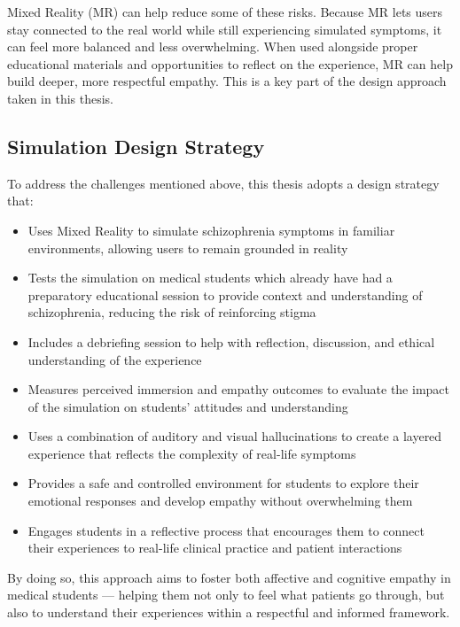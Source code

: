 Mixed Reality (MR) can help reduce some of these risks. Because MR lets users stay connected to the real world while still experiencing simulated symptoms, it can feel more balanced and less overwhelming. When used alongside proper educational materials and opportunities to reflect on the experience, MR can help build deeper, more respectful empathy. This is a key part of the design approach taken in this thesis.


\subsection{Simulation Design Strategy}
To address the challenges mentioned above, this thesis adopts a design strategy that:

\begin{itemize}
    \item Uses Mixed Reality to simulate schizophrenia symptoms in familiar environments, allowing users to remain grounded in reality
    \item Tests the simulation on medical students which already have had a preparatory educational session to provide context and understanding of schizophrenia, reducing the risk of reinforcing stigma
    \item Includes a debriefing session to help with reflection, discussion, and ethical understanding of the experience
    \item Measures perceived immersion and empathy outcomes to evaluate the impact of the simulation on students' attitudes and understanding
    \item Uses a combination of auditory and visual hallucinations to create a layered experience that reflects the complexity of real-life symptoms
    \item Provides a safe and controlled environment for students to explore their emotional responses and develop empathy without overwhelming them
    \item Engages students in a reflective process that encourages them to connect their experiences to real-life clinical practice and patient interactions
\end{itemize}

By doing so, this approach aims to foster both affective and cognitive empathy in medical students — helping them not only to feel what patients go through, but also to understand their experiences within a respectful and informed framework.
